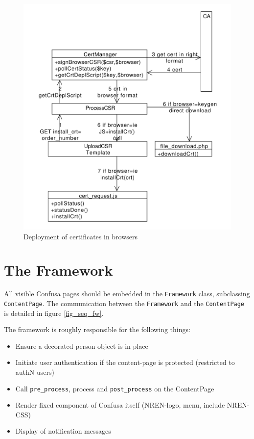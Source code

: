 \documentclass{scrartcl}
\begin{document}
\begin{figure}\label{fig_browser_deploy}
	\begin{center}
		\includegraphics[width=\textwidth]{browser_deploy_cert}
		\caption{Deployment of certificates in browsers}
	\end{center}
\end{figure}

\section{The Framework}

All visible Confusa pages should be embedded in the \verb+Framework+ class, subclassing \verb+ContentPage+. The communication between the \verb+Framework+ and the \verb+ContentPage+ is detailed in figure \ref{fig_seq_fw}.

The framework is roughly responsible for the following things:

\begin{itemize}
	\item Ensure a decorated person object is in place
	\item Initiate user authentication if the content-page is protected (restricted to authN users)
	\item Call \verb+pre_process+, process and \verb+post_process+ on the ContentPage
	\item Render fixed component of Confusa itself (NREN-logo, menu, include NREN-CSS)
	\item Display of notification messages
\end{itemize}
\end{document}
